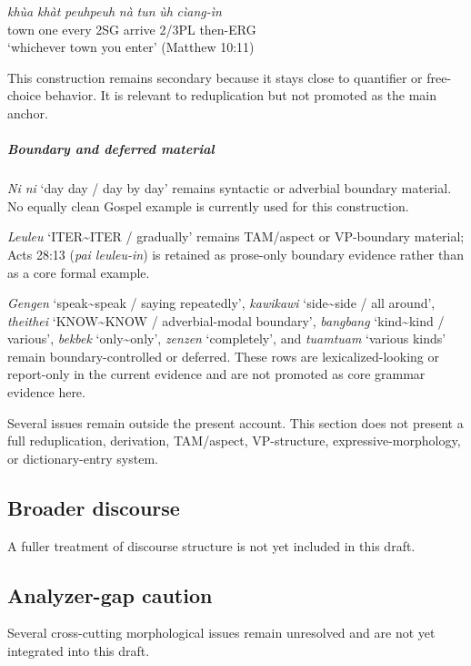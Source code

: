 \documentclass[
  11pt,
  a4paper,
]{article}
\newcommand{\tdim}[1]{\textit{#1}}
\newcommand{\tdimword}[1]{\textit{#1}}
\renewcommand{\textsc}[1]{{\footnotesize\MakeUppercase{#1}}}
\newcommand{\glossquote}[1]{`#1'}
\begin{document}
\begin{exe}
\ex \label{ex:red-peuhpeuh-matt10-11}
\gll \tdimword{khùa} \tdimword{khàt} \tdimword{peuhpeuh} \tdimword{nà} \tdimword{tun} \tdimword{ùh} \tdimword{cìang-ìn} \\
     town one every \textsc{2sg} arrive 2/3PL then-\textsc{erg} \\
\glt \glossquote{whichever town you enter} (Matthew 10:11)
\end{exe}

This construction remains secondary because it stays close to quantifier
or free-choice behavior. It is relevant to reduplication but not
promoted as the main anchor.

\subparagraph{Boundary and deferred
material}\label{boundary-and-deferred-material}

\tdim{Ni ni} \glossquote{day day / day by day} remains syntactic or
adverbial boundary material. No equally clean Gospel example is
currently used for this construction.

\tdim{Leuleu} \glossquote{ITER\textasciitilde{}ITER / gradually} remains
TAM/aspect or VP-boundary material; Acts 28:13 (\tdim{pai leuleu-in}) is
retained as prose-only boundary evidence rather than as a core formal
example.

\tdim{Gengen}
\glossquote{speak\textasciitilde{}speak / saying repeatedly},
\tdim{kawikawi} \glossquote{side\textasciitilde{}side / all around},
\tdim{theithei}
\glossquote{KNOW\textasciitilde{}KNOW / adverbial-modal boundary},
\tdim{bangbang} \glossquote{kind\textasciitilde{}kind / various},
\tdim{bekbek} \glossquote{only\textasciitilde{}only}, \tdim{zenzen}
\glossquote{completely}, and \tdim{tuamtuam} \glossquote{various kinds}
remain boundary-controlled or deferred. These rows are
lexicalized-looking or report-only in the current evidence and are not
promoted as core grammar evidence here.

Several issues remain outside the present account. This section does not
present a full reduplication, derivation, TAM/aspect, VP-structure,
expressive-morphology, or dictionary-entry system.

\subsection{Broader discourse}\label{broader-discourse}

A fuller treatment of discourse structure is not yet included in this
draft.

\subsection{Analyzer-gap caution}\label{analyzer-gap-caution}

Several cross-cutting morphological issues remain unresolved and are not
yet integrated into this draft.


\end{document}
